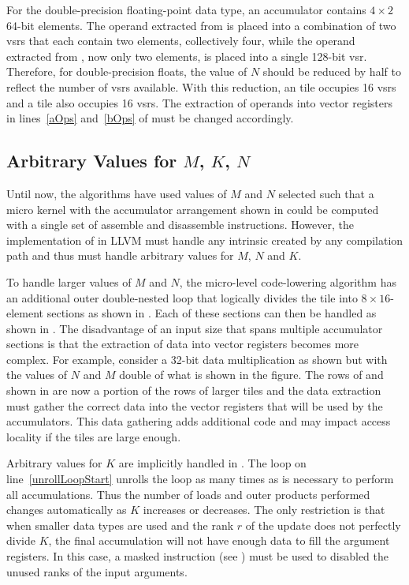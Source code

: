 \documentclass[\main/thesis.tex]{subfiles}
\begin{document}
For the double-precision floating-point data type, an accumulator contains $4 \times 2$ 64-bit elements.
The operand extracted from  is placed into a combination of two \glspl{vsr} that each contain two elements, collectively four, while the operand extracted from , now only two elements, is placed into a single 128-bit \gls{vsr}.
Therefore, for double-precision floats, the value of $N$ should be reduced by half to reflect the number of \glspl{vsr} available.
With this reduction, an  tile occupies 16 \glspl{vsr} and a  tile also occupies 16 \glspl{vsr}.
The extraction of operands into vector registers in lines~\ref{aOps} and~\ref{bOps} of  must be changed accordingly.

\subsection{Arbitrary Values for \texorpdfstring{$M$}{M}, \texorpdfstring{$K$}{K}, \texorpdfstring{$N$}{N}}
\label{sec:arbitraryDims}
Until now, the algorithms have used values of $M$ and $N$ selected such that a micro kernel with the accumulator arrangement shown in  could be computed with a single set of assemble and disassemble instructions.
However, the implementation of  in LLVM must handle any  intrinsic created by any compilation path and thus must handle arbitrary values for $M$, $N$ and $K$.

To handle larger values of $M$ and $N$, the micro-level code-lowering algorithm has an additional outer double-nested loop that logically divides the  tile into $8 \times 16$-element sections as shown in .
Each of these sections can then be handled as shown in .
The disadvantage of an input size that spans multiple accumulator sections is that the extraction of data into vector registers becomes more complex.
For example, consider a 32-bit data multiplication as shown  but with the values of $N$ and $M$ double of what is shown in the figure.
The rows of  and  shown in  are now a portion of the rows of larger tiles and the data extraction must gather the correct data into the vector registers that will be used by the accumulators.
This data gathering adds additional code and may impact access locality if the tiles are large enough.

Arbitrary values for $K$ are implicitly handled in .
The loop on line~\ref{unrollLoopStart} unrolls the loop as many times as is necessary to perform all accumulations.
Thus the number of loads and outer products performed changes automatically as $K$ increases or decreases.
The only restriction is that when smaller data types are used and the rank $r$ of the update does not perfectly divide $K$, the final accumulation will not have enough data to fill the argument registers.
In this case, a masked instruction (see ) must be used to disabled the unused ranks of the input arguments.
\end{document}
